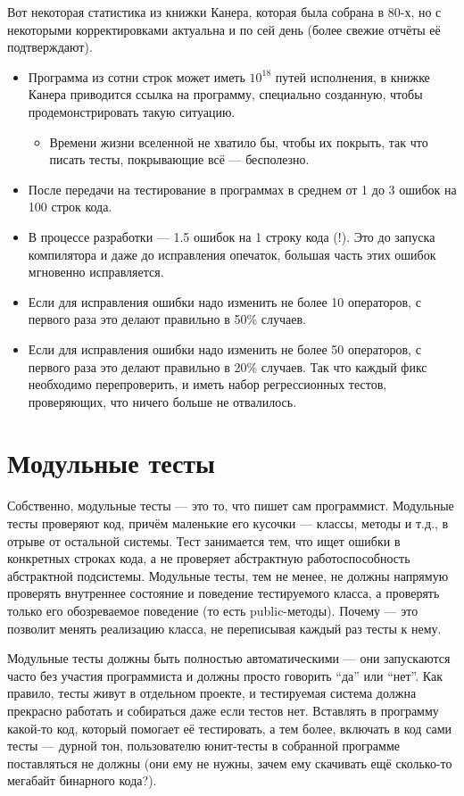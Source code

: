 \documentclass[a5paper]{article}
\begin{document}
Вот некоторая статистика из книжки Канера, которая была собрана в 80-х, но с некоторыми корректировками актуальна и по сей день (более свежие отчёты её подтверждают).

\begin{itemize}
    \item Программа из сотни строк может иметь $10^{18}$ путей исполнения, в книжке Канера приводится ссылка на программу, специально созданную, чтобы продемонстрировать такую ситуацию.
    \begin{itemize}
        \item Времени жизни вселенной не хватило бы, чтобы их покрыть, так что писать тесты, покрывающие всё --- бесполезно.
    \end{itemize}
    \item После передачи на тестирование в программах в среднем от 1 до 3 ошибок на 100 строк кода.
    \item В процессе разработки --- 1.5 ошибок на 1 строку кода (!). Это до запуска компилятора и даже до исправления опечаток, большая часть этих ошибок мгновенно исправляется.
    \item Если для исправления ошибки надо изменить не более 10 операторов, с первого раза это делают правильно в 50\% случаев.
    \item Если для исправления ошибки надо изменить не более 50 операторов, с первого раза это делают правильно в 20\% случаев. Так что каждый фикс необходимо перепроверить, и иметь набор регрессионных тестов, проверяющих, что ничего больше не отвалилось.
\end{itemize}

\section{Модульные тесты}

Собственно, модульные тесты --- это то, что пишет сам программист. Модульные тесты проверяют код, причём маленькие его кусочки --- классы, методы и т.д., в отрыве от остальной системы. Тест занимается тем, что ищет ошибки в конкретных строках кода, а не проверяет абстрактную работоспособность абстрактной подсистемы. Модульные тесты, тем не менее, не должны напрямую проверять внутреннее состояние и поведение тестируемого класса, а проверять только его обозреваемое поведение (то есть public-методы). Почему --- это позволит менять реализацию класса, не переписывая каждый раз тесты к нему.

Модульные тесты должны быть полностью автоматическими --- они запускаются часто без участия программиста и должны просто говорить ``да'' или ``нет''. Как правило, тесты живут в отдельном проекте, и тестируемая система должна прекрасно работать и собираться даже если тестов нет. Вставлять в программу какой-то код, который помогает её тестировать, а тем более, включать в код сами тесты --- дурной тон, пользователю юнит-тесты в собранной программе поставляться не должны (они ему не нужны, зачем ему скачивать ещё сколько-то мегабайт бинарного кода?).
\end{document}
